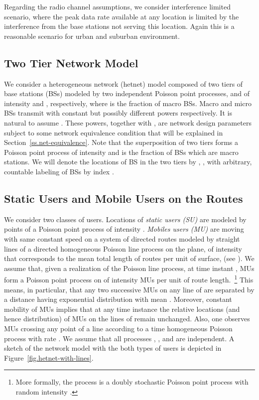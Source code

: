 \documentclass[10pt,journal]{IEEEtran}
\begin{document}
Regarding the radio channel assumptions, we consider interference
limited scenario, where the  peak data rate available at any location is limited by the
interference from the  base stations not serving this location. Again
this is a reasonable scenario for urban and suburban environment.



\subsection{Two Tier Network Model}\label{subsection:base-station}
We consider a heterogeneous network (hetnet) model composed of two tiers of
base stations (BSs) modeled by two independent Poisson point processes,
 and  of intensity 
and , respectively, where  is the fraction of macro BSs.
Macro and micro BSs transmit with constant but possibly different powers 
 respectively. It is natural to assume  . 
These powers, together with ,  are network design parameters
subject to some network equivalence condition that will be explained in Section~\ref{ss.net-equivalence}. 
Note that the superposition  of two tiers
 forms a Poisson point process of
intensity  and  is the fraction of BSs which are
macro stations. We will denote the  locations of BS in the two tiers by  , ,
with arbitrary, countable  labeling of BSs by index . 



\subsection{Static Users  and Mobile Users on the Routes}
\label{subsection:mobile-users}
We consider two classes of users. Locations of {\em static users (SU)} are modeled by points of a Poisson point process 
of intensity . {\em Mobiles users (MU)} are moving with
same constant speed  on a system of directed routes  modeled by
straight lines of a directed homogeneous  Poisson line process
 on the plane, of intensity  that  corresponds
to the mean total length of routes per unit of surface, (see 
\cite[Chapter~]{chiu-etal13stochastic-geometry-and-its-applications}).
We assume that, given a realization of the Poisson line process, at time instant , MUs form a Poisson point process
 on  of intensity  MUs per unit of 
route length.~\footnote{More formally, the process  is a doubly 
stochastic Poisson point process with random intensity .}
This means, in particular,  that any two  successive MUs on any line
of  are separated by a distance having exponential
distribution with mean . Moreover, constant mobility
of MUs implies that at any time instance  the relative locations
(and hence  distribution) of MUs on the lines of  remain
unchanged. Also, one observes MUs crossing any point of a line 
according to a time homogeneous Poisson process with rate .
We assume that all processes , ,  and   are independent. 
A sketch of the network model with the both types of users is depicted in Figure~\ref{fig.hetnet-with-lines}.
\end{document}
